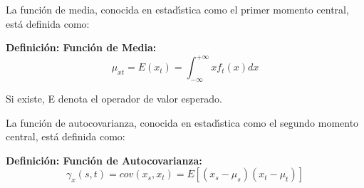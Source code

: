 La funci\'on de media, conocida en estad\'\i{}stica como el primer momento central, est\'a definida como:
\vspace{5mm}

\begin{definition}\label{def:def1}
	\textbf{Definici\'on: Funci\'on de Media:}
	\begin{equation*}
	\mu_{xt} = E(x_t)= \int^{+\infty}_{-\infty} x f_t(x)dx
	\end{equation*} 

\end{definition}

Si existe, E denota el operador de valor esperado.



La funci\'on de autocovarianza, conocida en estad\'\i{}stica como el segundo momento central, est\'a definida como:
\vspace{5mm}

\begin{definition}\label{def:def2}
	\textbf{Definici\'on: Funci\'on de Autocovarianza:} 
	\begin{equation*}
	\gamma_{x}(s,t) = cov(x_s, x_t) = E[(x_s - \mu_s)(x_t - \mu_t)] 
	\end{equation*}
\end{definition}

